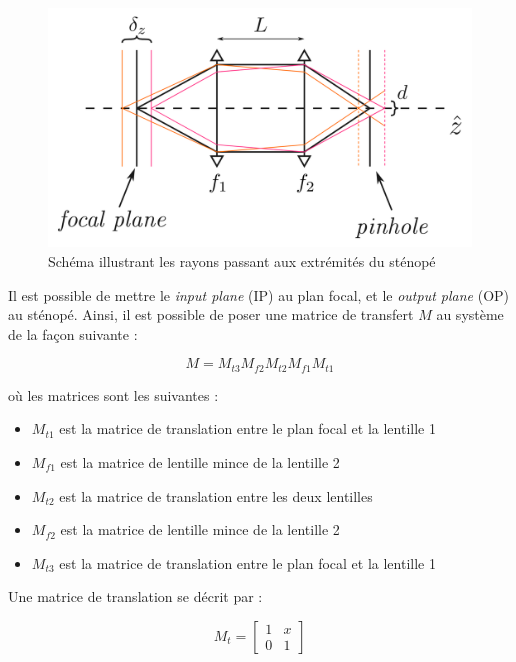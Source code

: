 \documentclass[11pt,letterpaper]{article}
\begin{document}
\begin{figure}[H]
  \centering
  \includegraphics[scale=0.15]{rayons_pinhole.png}
  \caption{Schéma illustrant les rayons passant aux extrémités du sténopé}
  \label{rayons}
\end{figure}

Il est possible de mettre le \textit{input plane} (IP) au plan focal, et le \textit{output plane} (OP) au sténopé. Ainsi, il est possible de poser une matrice de transfert $M$ au système de la façon suivante :

\begin{equation}
  M = M_{t3}M_{f2}M_{t2}M_{f1}M_{t1}
\end{equation}

où les matrices sont les suivantes :

\begin{itemize}
\item $M_{t1}$ est la matrice de translation entre le plan focal et la lentille 1
\item $M_{f1}$ est la matrice de lentille mince de la lentille 2
\item $M_{t2}$ est la matrice de translation entre les deux lentilles
\item $M_{f2}$ est la matrice de lentille mince de la lentille 2
\item $M_{t3}$ est la matrice de translation entre le plan focal et la lentille 1
\end{itemize}

Une matrice de translation se décrit par :

\begin{equation}
  M_{t}= 
  \begin{bmatrix}
    1 & x \\
    0 & 1
  \end{bmatrix}
\end{equation}
\end{document}
